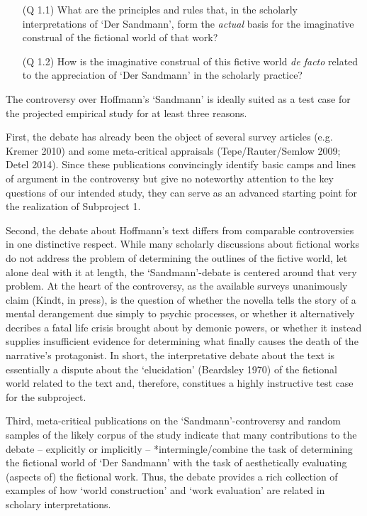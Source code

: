 \vspace{-.1cm}
\begin{itemize}[leftmargin=2cm]
\item[(Q 1.1)] What are the principles and rules that, in the scholarly interpretations of `Der Sandmann', form the \emph{actual} basis for the imaginative construal of the fictional world of that work?
\end{itemize}
\vspace{-.1cm}

\vspace{-.1cm}
\begin{itemize}[leftmargin=2cm]
\item[(Q 1.2)] How is the imaginative construal of this fictive world \emph{de facto} related to the appreciation of `Der Sandmann' in the scholarly practice?
\end{itemize}
\vspace{-.1cm}

\noindent The controversy over Hoffmann's `Sandmann' is ideally suited as a test case for the projected empirical study for at least three reasons. 

First, the debate has already been the object of several survey articles (e.g. Kremer 2010) and some meta-critical appraisals (Tepe/Rauter/Semlow 2009; Detel 2014). Since these publications convincingly identify basic camps and lines of argument in the controversy but give no noteworthy attention to the key questions of our intended study, they can serve as an advanced starting point for the realization of Subproject 1. 

Second, the debate about Hoffmann's text differs from comparable controversies in one distinctive respect. While many scholarly discussions about fictional works do not address the problem of determining the outlines of the fictive world, let alone deal with it at length, the `Sandmann'-debate is centered around that very problem. At the heart of the controversy, as the available surveys unanimously claim (Kindt, in press), is the question of whether the novella tells the story of a mental derangement due simply to psychic processes, or whether it alternatively decribes a fatal life crisis brought about by demonic powers, or whether it instead supplies insufficient evidence for determining what finally causes the death of the narrative's protagonist. In short, the interpretative debate about the text is essentially a dispute about the `elucidation' (Beardsley 1970) of the fictional world related to the text and, therefore, constitues a highly instructive test case for the subproject. 

Third, meta-critical publications on the `Sandmann'-controversy and random samples of the likely corpus of the study indicate that many contributions to the debate -- explicitly or implicitly -- *intermingle/combine the task of determining the fictional world of `Der Sandmann' with the task of aesthetically evaluating (aspects of) the fictional work. Thus, the debate provides a rich collection of examples of how `world construction' and `work evaluation' are related in scholary interpretations.